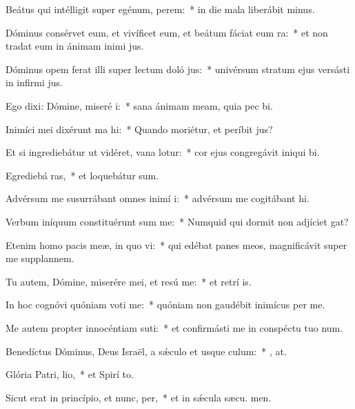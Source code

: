 \item Beátus qui intélligit super egénum,  perem:~* in die mala liberábit  minus.
\item Dóminus consérvet eum, et vivíficet eum, et beátum fáciat eum  ra:~* et non tradat eum in ánimam inimi jus.
\item Dóminus opem ferat illi super lectum doló jus:~* univérsum stratum ejus versásti in infirmi jus.
\item Ego dixi: Dómine, miseré i:~* sana ánimam meam, quia pec bi.
\item Inimíci mei dixérunt ma hi:~* Quando moriétur, et períbit  jus?
\item Et si ingrediebátur ut vidéret, vana lotur:~* cor ejus congregávit iniqui bi.
\item Egrediebá ras,~* et loquebátur  sum.
\item Advérsum me susurrábant omnes inimí i:~* advérsum me cogitábant  hi.
\item Verbum iníquum constituérunt sum me:~* Numquid qui dormit non adjíciet  gat?
\item Etenim homo pacis meæ, in quo vi:~* qui edébat panes meos, magnificávit super me supplannem.
\item Tu autem, Dómine, miserére mei, et resú me:~* et retrí is.
\item In hoc cognóvi quóniam voti me:~* quóniam non gaudébit inimícus  per me.
\item Me autem propter innocéntiam suti:~* et confirmásti me in conspéctu tuo  num.
\item Benedíctus Dóminus, Deus Israël, a sǽculo et usque  culum:~* , at.
\item Glória Patri,  lio,~* et Spirí to.
\item Sicut erat in princípio, et nunc,  per,~* et in sǽcula sæcu. men.

